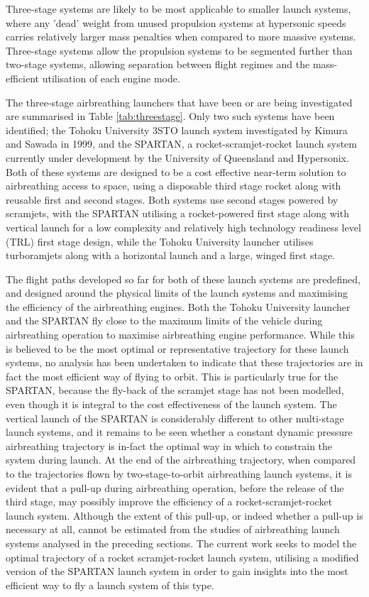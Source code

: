 Three-stage systems are likely to be most applicable to smaller launch systems, where any 'dead' weight from unused propulsion systems at hypersonic speeds carries relatively larger mass penalties when compared to more massive systems. Three-stage systems allow the propulsion systems to be segmented further than two-stage systems, allowing separation between flight regimes and the mass-efficient utilisation of each engine mode\cite{Preller2017b}.

The three-stage airbreathing launchers that have been or are being investigated are summarised in Table \ref{tab:threestage}. Only two such systems have been identified; the Tohoku University 3STO launch system investigated by Kimura and Sawada in 1999\cite{Kimura1999}, and the SPARTAN, a rocket-scramjet-rocket launch system currently under development by the University of Queensland and Hypersonix. Both of these systems are designed to be a cost effective near-term solution to airbreathing access to space, using a disposable third stage rocket along with reusable first and second stages. Both systems use second stages powered by scramjets, with the SPARTAN utilising a rocket-powered first stage along with vertical launch for a low complexity and relatively high technology readiness level (TRL) first stage design, while the Tohoku University launcher utilises turboramjets along with a horizontal launch and a large, winged first stage. 

 The flight paths developed so far for both of these launch systems are predefined, and designed around the physical limits of the launch systems and maximising the efficiency of the airbreathing engines. Both the Tohoku University launcher and the SPARTAN fly close to the maximum limits of the vehicle during airbreathing operation to maximise airbreathing engine performance.
While this is believed to be the most optimal or representative trajectory for these launch systems, no analysis has been undertaken to indicate that these trajectories are in fact the most efficient way of flying to orbit. This is particularly true for the SPARTAN, because the fly-back of the scramjet stage has not been modelled, even though it is integral to the cost effectiveness of the launch system. 
The vertical launch of the SPARTAN is considerably different to other multi-stage launch systems, and it remains to be seen whether a constant dynamic pressure airbreathing trajectory is in-fact the optimal way in which to constrain the system during launch. 
At the end of the airbreathing trajectory, when compared to the trajectories flown by two-stage-to-orbit airbreathing launch systems, it is evident that a pull-up during airbreathing operation, before the release of the third stage, may possibly improve the efficiency of a rocket-scramjet-rocket launch system. Although the extent of this pull-up, or indeed whether a pull-up is necessary at all, cannot be estimated from the studies of airbreathing launch systems analysed in the preceding sections.
The current work seeks to model the optimal trajectory of a rocket scramjet-rocket launch system, utilising a modified version of the SPARTAN launch system in order to gain insights into the most efficient way to fly a launch system of this type. 



